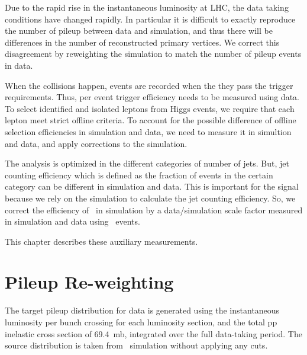 
Due to the rapid rise in the instantaneous luminosity at LHC, 
the data taking conditions have changed rapidly. 
In particular it is difficult to exactly reproduce the number of pileup 
between data and simulation, and thus there will be differences in the 
number of reconstructed primary vertices. 
We correct this disagreement by reweighting the simulation 
to match the number of pileup events in data.

When the collisions happen, 
events are recorded when the they pass the trigger requirements. 
Thus, per event trigger efficiency needs to be measured using data. 
To select identified and isolated leptons from Higgs events, we require 
that each lepton meet strict offline criteria. To account for the possible difference
of offline selection efficiencies in simulation and data, we need to measure it 
in simultion and data, and apply corrections to the simulation. 

The analysis is optimized in the different categories of number of jets. 
But, jet counting efficiency which is defined as the fraction 
of events in the certain category
can be different in simulation and data.  
This is important for the signal because we rely on the simulation 
to calculate the jet counting efficiency. 
So, we correct the efficiency of \hww\ in simulation by a data/simulation scale 
factor measured in simulation and data using \dyll~events.  

This chapter describes these auxiliary measurements. 

\section{Pileup Re-weighting}

The target pileup distribution for data is generated using the instantaneous luminosity 
per bunch crossing for each luminosity section, and the total pp inelastic cross section 
of 69.4~mb, integrated over the full data-taking period. The source distribution is taken 
from \dyll\ simulation without applying any cuts. 

